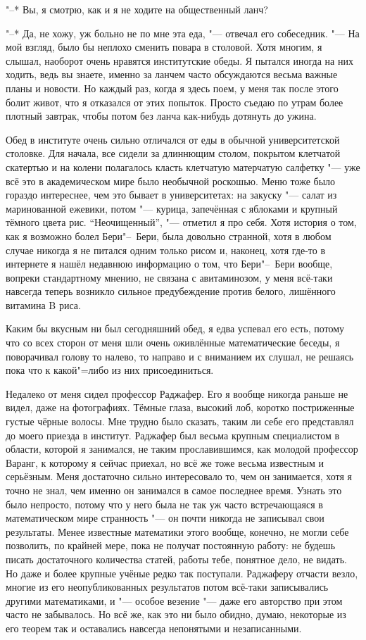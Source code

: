 "--* Вы, я смотрю, как и я не ходите на общественный ланч?

"--* Да, не хожу, уж больно не по мне эта еда, "--- отвечал его собеседник.
"--- На мой взгляд, было бы неплохо сменить повара в столовой.
Хотя многим, я слышал, наоборот очень нравятся институтские обеды.
Я пытался иногда на них ходить, ведь вы знаете, именно за ланчем часто
обсуждаются весьма важные планы и новости.
Но каждый раз, когда я здесь поем, у меня так после этого болит живот, что я
отказался от этих попыток.
Просто съедаю по утрам более плотный завтрак, чтобы потом без ланча как-нибудь
дотянуть до ужина.

Обед в институте очень сильно отличался от еды в обычной университетской
столовке.
Для начала, все сидели за длиннющим столом, покрытом клетчатой скатертью и на
колени полагалось класть клетчатую матерчатую салфетку "--- уже всё это в
академическом мире было необычной роскошью.
Меню тоже было гораздо интереснее, чем это бывает в университетах:
на закуску "--- салат из маринованной ежевики, потом "--- курица, запечённая с
яблоками и крупный тёмного цвета рис.
\enquote{Неочищенный}, "--- отметил я про себя.
Хотя история о том, как я возможно болел Бери"--~Бери, была довольно странной, хотя
в любом случае никогда я не питался одним только рисом и, наконец, хотя где-то
в интернете я нашёл недавнюю информацию о том, что Бери"--~Бери вообще, вопреки
стандартному мнению, не связана с авитаминозом, у меня всё-таки навсегда теперь
возникло сильное предубеждение против белого, лишённого витамина B риса.

Каким бы вкусным ни был сегодняшний обед, я едва успевал его есть, потому что со
всех сторон от меня шли очень оживлённые математические беседы, я поворачивал
голову то налево, то направо и с вниманием их слушал, не решаясь пока что к
какой"=либо из них присоединиться.

Недалеко от меня сидел профессор Раджафер.
Его я вообще никогда раньше не видел, даже на фотографиях.
Тёмные глаза, высокий лоб, коротко постриженные густые чёрные волосы.
Мне трудно было сказать, таким ли себе его представлял до моего приезда в
институт.
Раджафер был весьма крупным специалистом в области, которой я занимался, не
таким прославившимся, как молодой профессор Варанг, к которому я сейчас приехал,
но всё же тоже весьма известным и серьёзным.
Меня достаточно сильно интересовало то, чем он занимается, хотя я точно не знал,
чем именно он занимался в самое последнее время.
Узнать это было непросто, потому что у него была не так уж часто встречающаяся в
математическом мире странность "--- он почти никогда не записывал свои
результаты.
Менее известные математики этого вообще, конечно, не могли себе позволить, по
крайней мере, пока не получат постоянную работу:
не будешь писать достаточного количества статей, работы тебе, понятное дело, не
видать.
Но даже и более крупные учёные редко так поступали.
Раджаферу отчасти везло, многие из его неопубликованных результатов потом
всё-таки записывались другими математиками, и "--- особое везение "--- даже
его авторство при этом часто не забывалось.
Но всё же, как это ни было обидно, думаю, некоторые из его теорем так и
оставались навсегда непонятыми и незаписанными.

